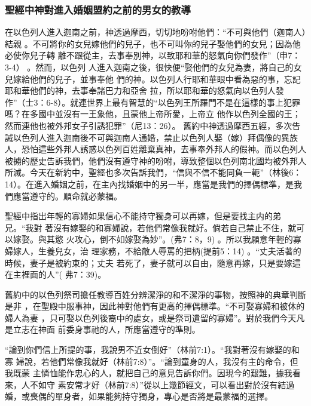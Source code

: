 \subsubsection{聖經中神對進入婚姻盟約之前的男女的教導}

在以色列人進入迦南之前，神透過摩西，切切地吩咐他們：“不可與他們（迦南人）結親
。不可將你的女兒嫁他們的兒子，也不可叫你的兒子娶他們的女兒；因為他必使你兒子轉
離不跟從主，去事奉別神，以致耶和華的怒氣向你們發作”（申7：3-4） 。然而，以色列
人進入迦南之後，很快便“娶他們的女兒為妻，將自己的女兒嫁給他們的兒子，並事奉他
們的神。以色列人行耶和華眼中看為惡的事，忘記耶和華他們的神，去事奉諸巴力和亞舍
拉，所以耶和華的怒氣向以色列人發作”（士3：6-8）。就連世界上最有智慧的“以色列王所羅門不是在這樣的事上犯罪嗎？在多國中並沒有一王象他，且蒙他上帝所愛，上帝立
他作以色列全國的王；然而連他也被外邦女子引誘犯罪”（尼13：26）。 舊約中神透過摩西五經，多次告誡以色列人進入迦南後不可與迦南人通婚，禁止以色列人娶（嫁）拜偶像的異族人，恐怕這些外邦人誘惑以色列百姓離棄真神，去事奉外邦人的假神。而以色列人被擄的歷史告訴我們，他們沒有遵守神的吩咐，導致整個以色列南北國均被外邦人所滅。今天在新約中，聖經也多次告訴我們，“信與不信不能同負一軛”（林後6：14）。在進入婚姻之前，在主內找婚姻中的另一半，應當是我們的擇偶標準，是我們應當遵守的。順命就必蒙福。


聖經中指出年輕的寡婦如果信心不能持守獨身可以再嫁，但是要找主内的弟兄。“我對
著沒有嫁娶的和寡婦說，若他們常像我就好。倘若自己禁止不住，就可以嫁娶。與其慾
火攻心，倒不如嫁娶為妙”。(弗7：8，9) 。所以我願意年輕的寡婦嫁人，生養兒女，治
理家務，不給敵人辱罵的把柄(提前5：14) 。“丈夫活著的時候，妻子是被約束的；丈夫
若死了，妻子就可以自由，隨意再嫁，只是要嫁這在主裡面的人”( 弗7：39)。

舊約中的以色列祭司擔任教導百姓分辨潔淨的和不潔淨的事物，按照神的典章判斷是非
，在聖殿中服事神，因此神對他們有更高的擇偶標準。“不可娶寡婦和被休的婦人為妻
，只可娶以色列後裔中的處女，或是祭司遺留的寡婦”。對於我們今天凡是立志在神面
前委身事祂的人，所應當遵守的準則。

“論到你們信上所提的事，我說男不近女倒好”（林前7:1）。“我對著沒有嫁娶的和寡
婦說，若他們常像我就好（林前7:8）”。“論到童身的人，我沒有主的命令，但我既蒙
主憐恤能作忠心的人，就把自己的意見告訴你們。因現今的艱難，據我看來，人不如守
素安常才好（林前7:8）”從以上幾節經文，可以看出對於沒有結過婚，或喪偶的單身者，如果能夠持守獨身，專心是否將是最蒙福的選擇。

